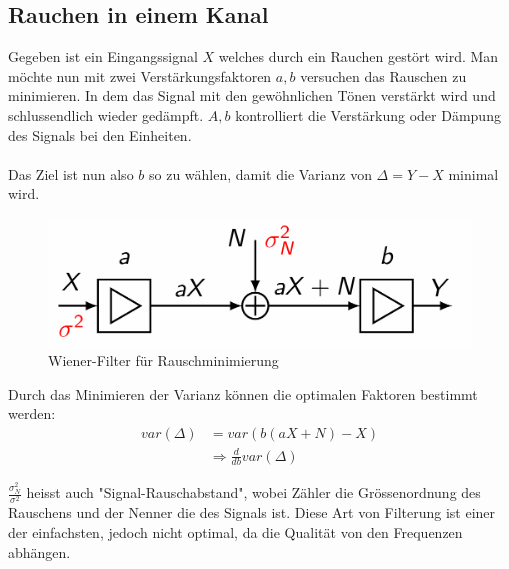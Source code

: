 \documentclass[../Main.tex]{subfiles}
\begin{document}
\subsection{Rauchen in einem Kanal}
Gegeben ist ein Eingangssignal \(X\) welches durch ein Rauchen gestört wird.
Man möchte nun mit zwei Verstärkungsfaktoren \(a,b\) versuchen das Rauschen zu minimieren.
In dem das Signal mit den gewöhnlichen Tönen verstärkt wird und schlussendlich wieder gedämpft.
\(A,b\) kontrolliert die Verstärkung oder Dämpung des Signals bei den Einheiten.
\\\\
Das Ziel ist nun also \(b\) so zu wählen, damit die Varianz von \(\Delta=Y-X\) minimal wird.

\begin{figure}[H]
    \centering
    \includegraphics[width=0.5\linewidth]{Images/wiener-filter.png}
    \caption{Wiener-Filter für Rauschminimierung}
\end{figure}

Durch das Minimieren der Varianz können die optimalen Faktoren bestimmt werden:
\begin{equation}
    \begin{split}
        var(\Delta) &= var(b(aX+N)-X)\\
        &\Rightarrow \frac{d}{db}var(\Delta)
    \end{split}
\end{equation}

\(\frac{\sigma_N^2}{\sigma^2}\) heisst auch "Signal-Rauschabstand", wobei Zähler
die Grössenordnung des Rauschens und der Nenner die des Signals ist.
Diese Art von Filterung ist einer der einfachsten, jedoch nicht optimal, da
die Qualität von den Frequenzen abhängen.

\end{document}
